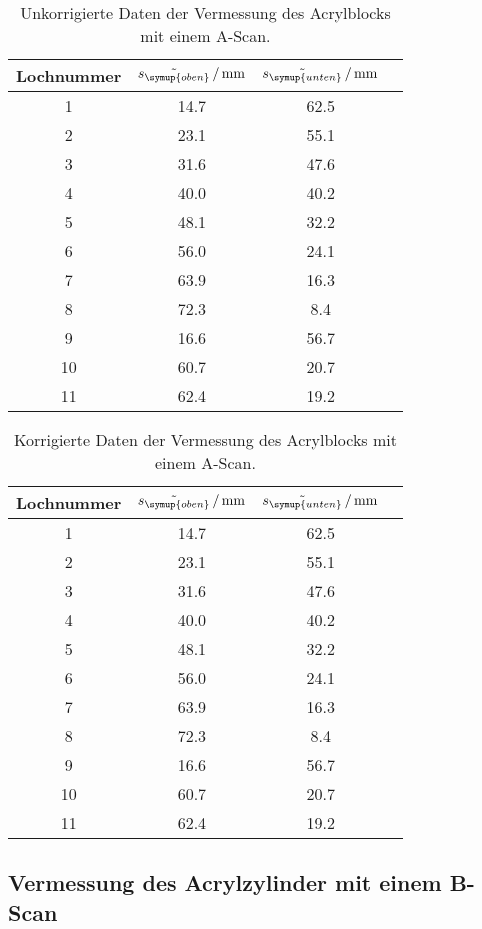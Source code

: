   \begin{table}[H]
    \centering
    \caption{Unkorrigierte Daten der Vermessung des Acrylblocks mit einem A-Scan.}
    \label{tab:a-scan}
    \begin{tabular}{S[table-format=2.0] S[table-format=2.1] S[table-format=2.1] S[table-format=2.1]}
        \toprule
         {Lochnummer} & {$\tilde{s_{\symup{oben}}}\,/\,\unit{\milli\metre}$} & {$\tilde{s_{\symup{unten}}}\,/\,\unit{\milli\metre}$} \\
        	& 14.7 & 62.5 \\
         2	& 23.1 & 55.1 \\
         3	& 31.6 & 47.6 \\
         4	& 40.0 & 40.2 \\
         5	& 48.1 & 32.2 \\
         6	& 56.0 & 24.1 \\
         7	& 63.9 & 16.3 \\
         8	& 72.3 &  8.4 \\
         9	& 16.6 & 56.7 \\
         10	& 60.7 & 20.7 \\
         11	& 62.4 & 19.2 \\
        \bottomrule 
    \end{tabular}
  \end{table}

  \begin{table}[H]
    \centering
    \caption{Korrigierte Daten der Vermessung des Acrylblocks mit einem A-Scan.}
    \label{tab:a-scan}
    \begin{tabular}{S[table-format=2.0] S[table-format=2.1] S[table-format=2.1] S[table-format=2.1]}
        \toprule
         {Lochnummer} & {$\tilde{s_{\symup{oben}}}\,/\,\unit{\milli\metre}$} & {$\tilde{s_{\symup{unten}}}\,/\,\unit{\milli\metre}$} \\
        	& 14.7 & 62.5 \\
         2	& 23.1 & 55.1 \\
         3	& 31.6 & 47.6 \\
         4	& 40.0 & 40.2 \\
         5	& 48.1 & 32.2 \\
         6	& 56.0 & 24.1 \\
         7	& 63.9 & 16.3 \\
         8	& 72.3 &  8.4 \\
         9	& 16.6 & 56.7 \\
         10	& 60.7 & 20.7 \\
         11	& 62.4 & 19.2 \\
        \bottomrule 
    \end{tabular}
  \end{table}
\subsection{Vermessung des Acrylzylinder mit einem B-Scan}
